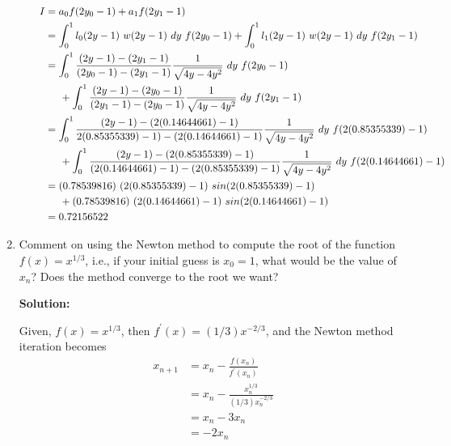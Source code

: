 \documentclass[a4paper,11pt]{report}
\begin{document}
\begin{enumerate}
\begin{itemize}
    \begin{equation*}
    \begin{aligned}
    I &= a_{0} f(2y_{0} - 1) + a_{1} f(2y_{1} - 1) \\
      &= \int_{0}^{1} l_{0}(2y-1)\ w(2y-1)\ dy\ f(2y_{0} - 1) + \int_{0}^{1} 
    l_{1}(2y-1)\ w(2y-1)\ dy\ f(2y_{1} - 1) \\
      &= \int_{0}^{1} \frac{(2y-1)-(2y_{1}-1)}{(2y_{0}-1)-(2y_{1}-1)} 
    \frac{1}{\sqrt{4y-4y^2}}\ dy\ f(2y_{0} - 1) \\ 
      & \hspace{0.5cm} + \int_{0}^{1} \frac{(2y-1)-(2y_{0}-1)}
    {(2y_{1}-1)-(2y_{0}-1)} \frac{1}{\sqrt{4y-4y^2}}\ dy\ f(2y_{1} - 1) \\
      &= \int_{0}^{1} \frac{(2y-1)-(2(0.14644661)-1)}{2(0.85355339)-1)-
    (2(0.14644661)-1)} \frac{1}{\sqrt{4y-4y^2}}\ dy\ f(2(0.85355339)-1) \\
      & \hspace{0.5cm} + \int_{0}^{1} \frac{(2y-1)-(2(0.85355339)-1)}
    {(2(0.14644661)-1)-(2(0.85355339)-1)} \frac{1}{\sqrt{4y-4y^2}}\ dy\ 
    f(2(0.14644661)-1) \\
      &= (0.78539816)\ (2(0.85355339)-1)\ sin(2(0.85355339)-1) \\
      & \hspace{0.5cm} + (0.78539816)\ (2(0.14644661)-1)\ 
    sin(2(0.14644661)-1) \\
      &= 0.72156522
    \end{aligned}
    \end{equation*}

    \end{itemize} 

    \vspace{1cm}

    \item Comment on using the Newton method to compute the root of the 
    function $f(x) = x^{1/3}$, i.e., if your initial guess is $x_{0} = 1$, 
    what would be the value of $x_{n}$? Does the method converge to the root 
    we want?

    \textbf{Solution:}

    Given, $f(x) = x^{1/3}$, then $f^{\prime}(x) = (1/3)x^{-2/3}$, and the 
    Newton method iteration becomes
    \begin{equation*}
    \begin{aligned}
    x_{n+1} &= x_{n} - \frac{f(x_{n})}{f^{\prime}(x_{n})} \\
    &= x_{n} - \frac{x_{n}^{1/3}}{(1/3)x_{n}^{-2/3}} \\
    &= x_{n} - 3x_{n} \\
    &= -2x_{n}
    \end{aligned}
    \end{equation*}
    

\end{enumerate}
\end{document}
